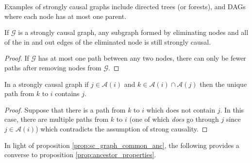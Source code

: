 \documentclass[12pt]{article}
\def\gcg{\mathcal{G}}  %
\newcommand{\anc}[1]{\mathcal{A}(#1)}  %
\begin{document}
Examples of strongly causal graphs include directed trees (or
forests), and DAGs where each node has at most one parent.

\begin{lemma}
  \label{lem:still_strongly_causal}
  If $\gcg$ is a strongly causal graph, any subgraph formed by eliminating nodes
  and all of the in and out edges of the eliminated node is still strongly causal.
\end{lemma}
\begin{proof}
  If $\gcg$ has at most one path between any two nodes, there can only
  be fewer paths after removing nodes from $\gcg$.
\end{proof}


\begin{proposition}
  \label{prop:sc_graph_common_anc}
  In a strongly causal graph if $j \in \anc{i}$ and $k \in \anc{i} \cap \anc{j}$ then the unique path from $k$ to $i$ contains $j$.
\end{proposition}
\begin{proof}
  Suppose that there is a path from $k$ to $i$ which does not contain $j$.  In this case, there are multiple paths from $k$ to $i$ (one of which \textit{does} go through $j$ since $j \in \anc{i}$) which contradicts the assumption of strong causality.
\end{proof}


In light of proposition \ref{prop:sc_graph_common_anc}, the following
provides a converse to proposition \ref{prop:ancestor_properties}.
\end{document}
